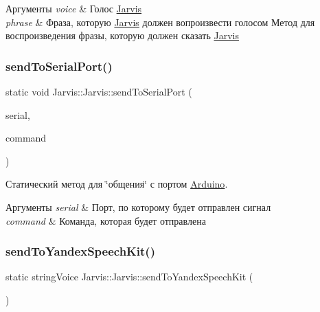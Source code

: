 \begin{DoxyParams}{Аргументы}
{\em voice} & Голос \hyperlink{classJarvis_1_1Jarvis}{Jarvis} \\
\hline
{\em phrase} & Фраза, которую \hyperlink{classJarvis_1_1Jarvis}{Jarvis} должен вопроизвести голосом Метод для воспроизведения фразы, которую должен сказать \hyperlink{classJarvis_1_1Jarvis}{Jarvis} \\
\hline
\end{DoxyParams}
\mbox{\label{classJarvis_1_1Jarvis_a211625e415e0aeb22eba6fab2deaa5e1}} 
\subsubsection{\texorpdfstring{send\+To\+Serial\+Port()}{sendToSerialPort()}}
{\footnotesize\ttfamily static void Jarvis\+::\+Jarvis\+::send\+To\+Serial\+Port (\begin{DoxyParamCaption}\item[{\hyperlink{classJarvis_1_1Arduino_1_1Connection_1_1SerialPort}{Serial\+Port} \&}]{serial,  }\item[{const std\+::string \&}]{command }\end{DoxyParamCaption})\hspace{0.3cm}{\ttfamily [static]}}



Статический метод для \char`\"{}общения\char`\"{} с портом \hyperlink{namespaceArduino}{Arduino}. 


\begin{DoxyParams}{Аргументы}
{\em serial} & Порт, по которому будет отправлен сигнал \\
\hline
{\em command} & Команда, которая будет отправлена \\
\hline
\end{DoxyParams}
\mbox{\label{classJarvis_1_1Jarvis_a4b45c41bc3fb910b2cf2f032b5fa0c08}} 
\subsubsection{\texorpdfstring{send\+To\+Yandex\+Speech\+Kit()}{sendToYandexSpeechKit()}}
{\footnotesize\ttfamily static string\+Voice Jarvis\+::\+Jarvis\+::send\+To\+Yandex\+Speech\+Kit (\begin{DoxyParamCaption}{ }\end{DoxyParamCaption})\hspace{0.3cm}{\ttfamily [static]}}



